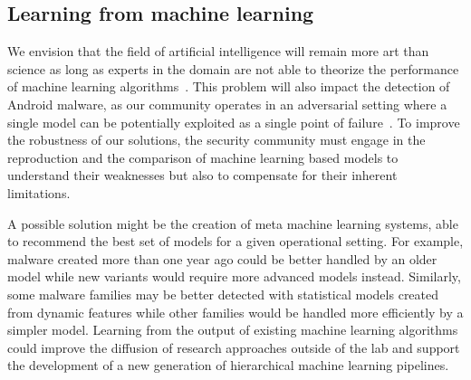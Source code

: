 \subsection{Learning from machine learning}
We envision that the field of artificial intelligence will remain more art than science as long as experts in the domain are not able to theorize the performance of machine learning algorithms~\cite{tramer_ensemble_2017,lipton_mythos_2018}.
This problem will also impact the detection of Android malware, as our community operates in an adversarial setting where a single model can be potentially exploited as a single point of failure~\cite{sommer_outside_2010,rossow_prudent_2012,papernot_practical_2016}.
To improve the robustness of our solutions, the security community must engage in the reproduction and the comparison of machine learning based models to understand their weaknesses but also to compensate for their inherent limitations.

A possible solution might be the creation of meta machine learning systems, able to recommend the best set of models for a given operational setting.
For example, malware created more than one year ago could be better handled by an older model while new variants would require more advanced models instead.
Similarly, some malware families may be better detected with statistical models created from dynamic features while other families would be handled more efficiently by a simpler model.
Learning from the output of existing machine learning algorithms could improve the diffusion of research approaches outside of the lab and support the development of a new generation of hierarchical machine learning pipelines.
